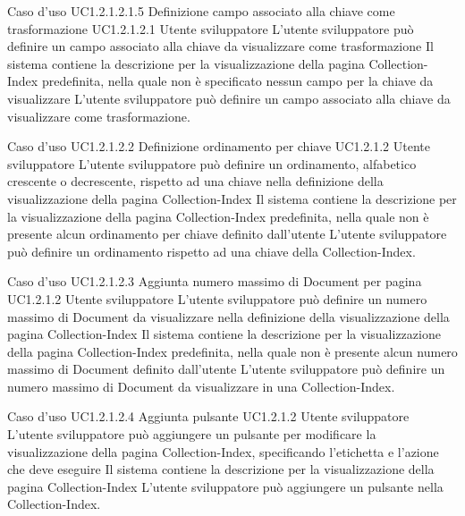 \UCtitle
{Caso d'uso UC1.2.1.2.1.5}
{Definizione campo associato alla chiave come trasformazione}
\UC
{UC1.2.1.2.1}
{Utente sviluppatore}
{L'utente sviluppatore può definire un campo associato alla chiave da visualizzare come trasformazione}
{Il sistema contiene la descrizione per la visualizzazione della pagina Collection-Index predefinita, nella quale non è specificato nessun campo per la chiave da visualizzare}
\scenario
{L'utente sviluppatore può definire un campo associato alla chiave da visualizzare come trasformazione.}

\UCtitle
{Caso d'uso UC1.2.1.2.2}
{Definizione ordinamento per chiave}
\UC
{UC1.2.1.2}
{Utente sviluppatore}
{L'utente sviluppatore  può  definire un ordinamento, alfabetico crescente o decrescente, rispetto ad una chiave nella definizione della visualizzazione della pagina Collection-Index}
{Il sistema contiene la descrizione per la visualizzazione della pagina Collection-Index predefinita, nella quale non è presente alcun ordinamento per chiave definito dall'utente}
\scenario
{L'utente sviluppatore può definire un ordinamento rispetto ad una chiave della Collection-Index.}

\UCtitle
{Caso d'uso UC1.2.1.2.3}
{Aggiunta numero massimo di Document per pagina}
\UC
{UC1.2.1.2}
{Utente sviluppatore}
{L'utente sviluppatore  può definire un numero massimo di Document da visualizzare nella definizione della visualizzazione della pagina Collection-Index}
{Il sistema contiene la descrizione per la visualizzazione della pagina Collection-Index predefinita, nella quale non è presente alcun numero massimo di Document definito dall'utente}
\scenario
{L'utente sviluppatore può definire un numero massimo di Document da visualizzare in una Collection-Index.}

\UCtitle
{Caso d'uso UC1.2.1.2.4}
{Aggiunta pulsante}
\UC
{UC1.2.1.2}
{Utente sviluppatore}
{L'utente sviluppatore può aggiungere un pulsante per modificare la visualizzazione della pagina Collection-Index, specificando l'etichetta e l'azione che deve eseguire}
{Il sistema contiene la descrizione per la visualizzazione della pagina Collection-Index}
\scenario
{L'utente sviluppatore può aggiungere un pulsante nella Collection-Index.}


